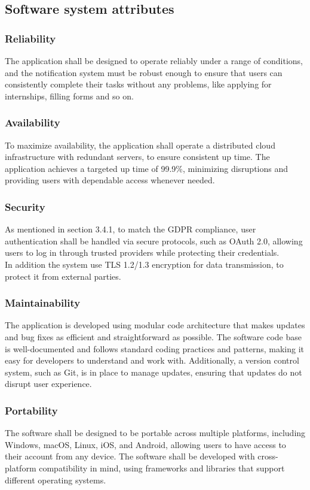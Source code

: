 \documentclass[11pt,twoside]{article}
\begin{document}
	\subsection{Software system attributes}
		\subsubsection{Reliability}
The application shall be designed to operate reliably under a range of conditions, and the notification system must be robust enough to ensure that users can consistently complete their tasks without any problems, like applying for internships, filling forms and so on.
		
		\subsubsection{Availability}
To maximize availability, the application shall operate a distributed cloud infrastructure with redundant servers, to ensure consistent up time. The application achieves a targeted up time of 99.9\%, minimizing disruptions and providing users with dependable access whenever needed.
		
		\subsubsection{Security}
As mentioned in section 3.4.1, to match the GDPR compliance, user authentication shall be handled via secure protocols, such as OAuth 2.0, allowing users to log in through trusted providers while protecting their credentials. \\
In addition the system use TLS 1.2/1.3 encryption for data transmission, to protect it from external parties.
		
		\subsubsection{Maintainability}
The application is developed using modular code architecture that makes updates and bug fixes as efficient and straightforward as possible. The software code base is well-documented and follows standard coding practices and patterns, making it easy for developers to understand and work with. Additionally, a version control system, such as Git, is in place to manage updates, ensuring that updates do not disrupt user experience.
		
		\subsubsection{Portability}
The software shall be designed to be portable across multiple platforms, including Windows, macOS, Linux, iOS, and Android, allowing users to have access to their account from any device. The software shall be developed with cross-platform compatibility in mind, using frameworks and libraries that support different operating systems.	
\end{document}
